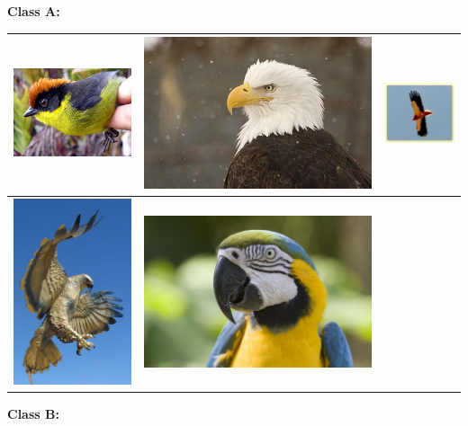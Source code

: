 \documentclass[fleqn]{article}
\begin{document}
{\bf\Huge Class A:}



\begin{tabular}{|c|c|c|}
\hline
\includegraphics[width=.25\textwidth]{061010-new-bird_big.jpg}
&
\includegraphics[width=.25\textwidth]{bald_eagle_bird_MG0813.jpg}
&
\includegraphics[width=.25\textwidth]{bird2.jpg}
\\
\hline
\includegraphics[width=.15\textwidth]{Buckeye-Hawk-right-side1-840.jpg}
&
\includegraphics[width=.25\textwidth]{parrot_heada.jpg}
&
\\
\hline
\end{tabular}

{\bf\Huge Class B:}
\end{document}
